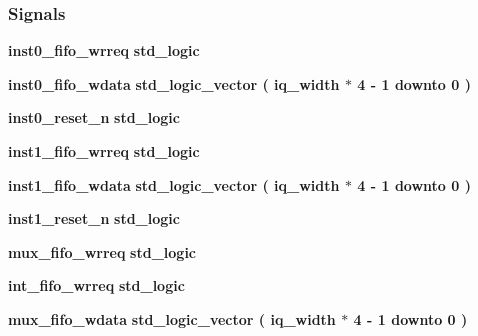 \subsubsection*{Signals}
 \begin{DoxyCompactItemize}
\item 
{\bf inst0\+\_\+fifo\+\_\+wrreq} {\bfseries \textcolor{comment}{std\+\_\+logic}\textcolor{vhdlchar}{ }} 
\item 
{\bf inst0\+\_\+fifo\+\_\+wdata} {\bfseries \textcolor{comment}{std\+\_\+logic\+\_\+vector}\textcolor{vhdlchar}{ }\textcolor{vhdlchar}{(}\textcolor{vhdlchar}{ }\textcolor{vhdlchar}{ }\textcolor{vhdlchar}{ }\textcolor{vhdlchar}{ }{\bfseries {\bf iq\+\_\+width}} \textcolor{vhdlchar}{$\ast$}\textcolor{vhdlchar}{ } \textcolor{vhdldigit}{4} \textcolor{vhdlchar}{-\/}\textcolor{vhdlchar}{ } \textcolor{vhdldigit}{1} \textcolor{vhdlchar}{ }\textcolor{keywordflow}{downto}\textcolor{vhdlchar}{ }\textcolor{vhdlchar}{ } \textcolor{vhdldigit}{0} \textcolor{vhdlchar}{ }\textcolor{vhdlchar}{)}\textcolor{vhdlchar}{ }} 
\item 
{\bf inst0\+\_\+reset\+\_\+n} {\bfseries \textcolor{comment}{std\+\_\+logic}\textcolor{vhdlchar}{ }} 
\item 
{\bf inst1\+\_\+fifo\+\_\+wrreq} {\bfseries \textcolor{comment}{std\+\_\+logic}\textcolor{vhdlchar}{ }} 
\item 
{\bf inst1\+\_\+fifo\+\_\+wdata} {\bfseries \textcolor{comment}{std\+\_\+logic\+\_\+vector}\textcolor{vhdlchar}{ }\textcolor{vhdlchar}{(}\textcolor{vhdlchar}{ }\textcolor{vhdlchar}{ }\textcolor{vhdlchar}{ }\textcolor{vhdlchar}{ }{\bfseries {\bf iq\+\_\+width}} \textcolor{vhdlchar}{$\ast$}\textcolor{vhdlchar}{ } \textcolor{vhdldigit}{4} \textcolor{vhdlchar}{-\/}\textcolor{vhdlchar}{ } \textcolor{vhdldigit}{1} \textcolor{vhdlchar}{ }\textcolor{keywordflow}{downto}\textcolor{vhdlchar}{ }\textcolor{vhdlchar}{ } \textcolor{vhdldigit}{0} \textcolor{vhdlchar}{ }\textcolor{vhdlchar}{)}\textcolor{vhdlchar}{ }} 
\item 
{\bf inst1\+\_\+reset\+\_\+n} {\bfseries \textcolor{comment}{std\+\_\+logic}\textcolor{vhdlchar}{ }} 
\item 
{\bf mux\+\_\+fifo\+\_\+wrreq} {\bfseries \textcolor{comment}{std\+\_\+logic}\textcolor{vhdlchar}{ }} 
\item 
{\bf int\+\_\+fifo\+\_\+wrreq} {\bfseries \textcolor{comment}{std\+\_\+logic}\textcolor{vhdlchar}{ }} 
\item 
{\bf mux\+\_\+fifo\+\_\+wdata} {\bfseries \textcolor{comment}{std\+\_\+logic\+\_\+vector}\textcolor{vhdlchar}{ }\textcolor{vhdlchar}{(}\textcolor{vhdlchar}{ }\textcolor{vhdlchar}{ }\textcolor{vhdlchar}{ }\textcolor{vhdlchar}{ }{\bfseries {\bf iq\+\_\+width}} \textcolor{vhdlchar}{$\ast$}\textcolor{vhdlchar}{ } \textcolor{vhdldigit}{4} \textcolor{vhdlchar}{-\/}\textcolor{vhdlchar}{ } \textcolor{vhdldigit}{1} \textcolor{vhdlchar}{ }\textcolor{keywordflow}{downto}\textcolor{vhdlchar}{ }\textcolor{vhdlchar}{ } \textcolor{vhdldigit}{0} \textcolor{vhdlchar}{ }\textcolor{vhdlchar}{)}\textcolor{vhdlchar}{ }} 

\end{DoxyCompactItemize}
